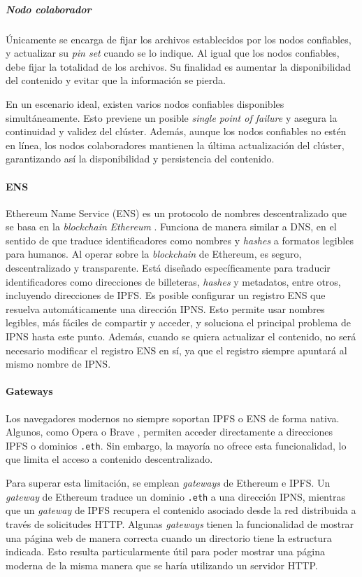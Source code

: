 \subparagraph{Nodo colaborador} Únicamente se encarga de fijar los archivos establecidos por los nodos confiables, y actualizar su \textit{pin set} cuando se lo indique. Al igual que los nodos confiables, debe fijar la totalidad de los archivos. Su finalidad es aumentar la disponibilidad del contenido y evitar que la información se pierda.

En un escenario ideal, existen varios nodos confiables disponibles simultáneamente. Esto previene un posible \textit{single point of failure} y asegura la continuidad y validez del clúster. Además, aunque los nodos confiables no estén en línea, los nodos colaboradores mantienen la última actualización del clúster, garantizando así la disponibilidad y persistencia del contenido.

\paragraph{ENS} Ethereum Name Service (ENS) es un protocolo de nombres descentralizado que se basa en la \textit{blockchain} \textit{Ethereum} \cite{ens}. Funciona de manera similar a DNS, en el sentido de que traduce identificadores como nombres y \textit{hashes} a formatos legibles para humanos. Al operar sobre la \textit{blockchain} de Ethereum, es seguro, descentralizado y transparente. Está diseñado específicamente para traducir identificadores como direcciones de billeteras, \textit{hashes} y metadatos, entre otros, incluyendo direcciones de IPFS. Es posible configurar un registro ENS que resuelva automáticamente una dirección IPNS. Esto permite usar nombres legibles, más fáciles de compartir y acceder, y soluciona el principal problema de IPNS hasta este punto. Además, cuando se quiera actualizar el contenido, no será necesario modificar el registro ENS en sí, ya que el registro siempre apuntará al mismo nombre de IPNS.

\paragraph{Gateways} Los navegadores modernos no siempre soportan IPFS o ENS de forma nativa. Algunos, como Opera \cite{opera-ipfs} o Brave \cite{brave-ipfs}, permiten acceder directamente a direcciones IPFS o dominios \texttt{.eth}. Sin embargo, la mayoría no ofrece esta funcionalidad, lo que limita el acceso a contenido descentralizado.

Para superar esta limitación, se emplean \textit{gateways} de Ethereum e IPFS. Un \textit{gateway} de Ethereum traduce un dominio \texttt{.eth} a una dirección IPNS, mientras que un \textit{gateway} de IPFS recupera el contenido asociado desde la red distribuida a través de solicitudes HTTP. Algunas \textit{gateways} tienen la funcionalidad de mostrar una página web de manera correcta cuando un directorio tiene la estructura indicada. Esto resulta particularmente útil para poder mostrar una página moderna de la misma manera que se haría utilizando un servidor HTTP.

